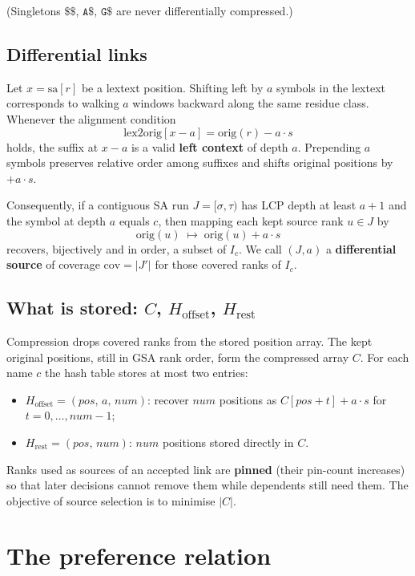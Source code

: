 \documentclass[11pt,a4paper]{article}
\begin{document}
(Singletons \(\mathtt{\$\$}\), \(\mathtt{A\$}\), \(\mathtt{G\$}\) are
never differentially compressed.)

\subsection{Differential links}

Let \(x=\mathrm{sa}[r]\) be a lextext position. Shifting left by \(a\)
symbols in the lextext corresponds to walking \(a\) windows backward
along the same residue class. Whenever the alignment condition
\[
\mathrm{lex2orig}[x-a] = \mathrm{orig}(r) - a\cdot s
\]
holds, the suffix at \(x-a\) is a valid \textbf{left context} of depth
\(a\). Prepending \(a\) symbols preserves relative order among suffixes
and shifts original positions by \(+a\cdot s\).

Consequently, if a contiguous SA run \(J=[\sigma,\tau)\) has LCP depth
at least \(a+1\) and the symbol at depth \(a\) equals \(c\), then
mapping each kept source rank \(u\in J\) by
\[
\mathrm{orig}(u)\;\longmapsto\;\mathrm{orig}(u)+a\cdot s
\]
recovers, bijectively and in order, a subset of \(I_c\). We call
\((J,a)\) a \textbf{differential source} of coverage
\(\mathrm{cov}=|J'|\) for those covered ranks of \(I_c\).

\subsection{What is stored: \(C\), \(H_{\mathrm{offset}}\),
\(H_{\mathrm{rest}}\)}

Compression drops covered ranks from the stored position array. The
kept original positions, still in GSA rank order, form the compressed
array \(C\). For each name \(c\) the hash table stores at most two
entries:
\begin{itemize}
\item \(H_{\mathrm{offset}}=(\mathit{pos},\,a,\,\mathit{num})\):
  recover \(\mathit{num}\) positions as
  \(C[\mathit{pos}+t]+a\cdot s\) for \(t=0,\ldots,\mathit{num}-1\);
\item \(H_{\mathrm{rest}}=(\mathit{pos},\,\mathit{num})\):
  \(\mathit{num}\) positions stored directly in \(C\).
\end{itemize}
Ranks used as sources of an accepted link are \textbf{pinned} (their
pin-count increases) so that later decisions cannot remove them while
dependents still need them. The objective of source selection is to
minimise \(|C|\).

\section{The preference relation}
\end{document}

